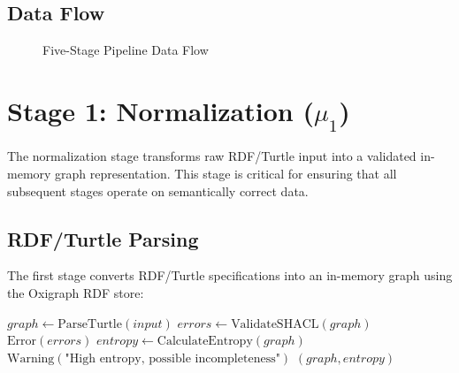\subsection{Data Flow}

\begin{figure}[h]
\centering
{}
\caption{Five-Stage Pipeline Data Flow}
\end{figure}

\section{Stage 1: Normalization (\(\mu_1\))}

The normalization stage transforms raw RDF/Turtle input into a validated in-memory graph representation. This stage is critical for ensuring that all subsequent stages operate on semantically correct data.

\subsection{RDF/Turtle Parsing}

The first stage converts RDF/Turtle specifications into an in-memory graph using the Oxigraph RDF store:

\begin{algorithm}
\caption{Normalization Stage \(\mu_1\)}
\begin{algorithmic}[1]
    \State $graph \gets \text{ParseTurtle}(input)$
    \State $errors \gets \text{ValidateSHACL}(graph)$
        \State \Return $\text{Error}(errors)$
    \EndIf
    \State $entropy \gets \text{CalculateEntropy}(graph)$
        \State \Return $\text{Warning}(\text{"High entropy, possible incompleteness"})$
    \EndIf
    \State \Return $(graph, entropy)$
\EndProcedure
\end{algorithmic}
\end{algorithm}

